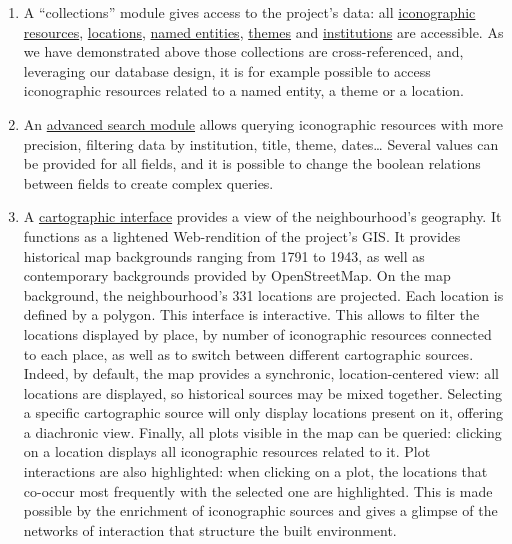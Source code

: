 \documentclass[12pt, a4paper, twocolumn]{article}
\begin{document}
\begin{enumerate}
    \item A ``collections'' module gives access to the project's data: all \href{https://quartier-richelieu.inha.fr/iconographie}{iconographic resources}, \href{https://quartier-richelieu.inha.fr/lieu}{locations}, \href{https://quartier-richelieu.inha.fr/entite-nommee}{named entities}, \href{https://quartier-richelieu.inha.fr/theme}{themes} and \href{https://quartier-richelieu.inha.fr/institution}{institutions} are accessible. As we have demonstrated above those collections are cross-referenced, and, leveraging our database design, it is for example possible to access iconographic resources related to a named entity, a theme or a location.
    \item An \href{https://quartier-richelieu.inha.fr/recherche}{advanced search module} allows querying iconographic resources with more precision, filtering data by institution, title, theme, dates… Several values can be provided for all fields, and it is possible to change the boolean relations between fields to create complex queries. 
    \item A \href{https://quartier-richelieu.inha.fr/cartographie}{cartographic interface} provides a view of the neighbourhood's geography. It functions as a lightened Web-rendition of the project's GIS. It provides historical map backgrounds ranging from 1791 to 1943, as well as contemporary backgrounds provided by OpenStreetMap. On the map background, the neighbourhood's 331 locations are projected. Each location is defined by a polygon. This interface is interactive. This allows to filter the locations displayed by place, by number of iconographic resources connected to each place, as well as to switch between different cartographic sources. Indeed, by default, the map provides a synchronic, location-centered view: all locations are displayed, so historical sources may be mixed together. Selecting a specific cartographic source will only display locations present on it, offering a diachronic view. Finally, all plots visible in the map can be queried: clicking on a location displays all iconographic resources related to it. Plot interactions are also highlighted: when clicking on a plot, the locations that co-occur most frequently with the selected one are highlighted. This is made possible by the enrichment of iconographic sources and gives a glimpse of the networks of interaction that structure the built environment.

\end{enumerate}
\end{document}
